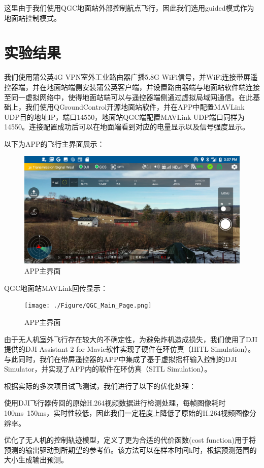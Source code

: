 这里由于我们使用QGC地面站外部控制航点飞行，因此我们选用guided模式作为地面站控制模式。

\chapter{实验结果}

我们使用蒲公英4G VPN室外工业路由器广播5.8G WiFi信号，并WiFi连接带屏遥控器端，并在地面站端侧安装蒲公英客户端，并设置路由器端与地面站软件端连接至同一虚拟网络中，使得地面站端可以与遥控器端侧通过虚拟局域网通信。在此基础上，我们使用QGroundControl开源地面站软件，并在APP中配置MAVLink UDP目的地址IP，端口14550，地面站QGC端配置MAVLink UDP端口同样为14550。连接配置成功后可以在地面端看到对应的电量显示以及信号强度显示。

以下为APP的飞行主界面展示：

\begin{figure}[ht]
  \centering
  \includegraphics[width=0.8\linewidth]{./Figure/APP_Main_Page.png}
  \caption{APP主界面}\label{Fig:xd1}
\end{figure}

QGC地面站MAVLink回传显示：

\begin{figure}[ht]
  \centering
  \texttt{[image: ./Figure/QGC\_Main\_Page.png]}
  \caption{APP主界面}\label{Fig:xd1}
\end{figure}

由于无人机室外飞行存在较大的不确定性，为避免炸机造成损失，我们使用了DJI提供的DJI Assistant 2 for Mavic软件实现了硬件在环仿真（HITL Simulation）。与此同时，我们在带屏遥控器的APP中集成了基于虚拟摇杆输入控制的DJI Simulator，并实现了APP内的软件在环仿真（SITL Simulation）。

根据实际的多次项目试飞测试，我们进行了以下的优化处理：

使用DJI飞行器传回的原始H.264视频数据进行检测处理，每帧图像耗时100ms~150ms，实时性较低，因此我们一定程度上降低了原始的H.264视频图像分辨率。

优化了无人机的控制轨迹模型，定义了更为合适的代价函数(cost function)用于将预测的输出驱动到所期望的参考值。该方法可以在样本时间k时，根据预测范围的大小生成输出预测。

